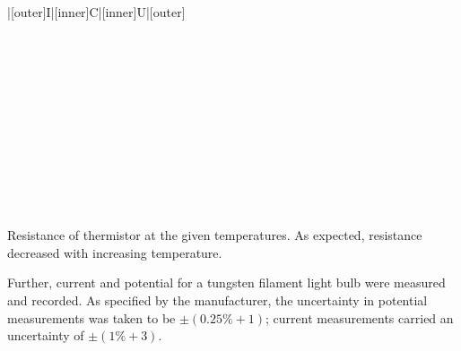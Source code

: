 \begin{paper}
{\begin{papertable}{|[outer]I|[inner]C|[inner]U|[outer]}
			\papertableindex{}\\\paperiline
			\papertableindex{}\\\paperiline
			\papertableindex{}\\\paperiline
			\papertableindex{}\\\paperiline
			\papertableindex{}\\\paperiline
			\papertableindex{}\\\paperiline
			\papertableindex{}\\\paperiline
			\papertableindex{}\\\paperiline
			\papertableindex{}\\\paperiline
			\papertableindex{}\\\paperiline
			\papertableindex{}\\\paperiline
			\papertableindex{}\\\paperoline
		\end{papertable}\vspace{-1.5em}}
	{Resistance of thermistor at the given temperatures. As expected, resistance decreased with increasing temperature.}\vspace{1em}
	
	Further, current and potential for a tungsten filament light bulb were measured and recorded. As specified by the manufacturer, the uncertainty in potential measurements was taken to be \( \pm (0.25\% + 1) \); current measurements carried an uncertainty of \( \pm (1\% + 3) \).


\end{paper}
